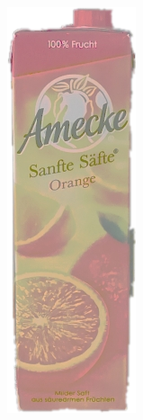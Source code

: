 \documentclass[a4paper,12pt,oneside]{article}
\begin{document}
\begin{figure}[htb]
\begin{minipage}[c]{0.08\textwidth}
\includegraphics[width=\textwidth]{Sources/Bild3_HS.png}

\end{minipage}
\end{figure}
\end{document}
